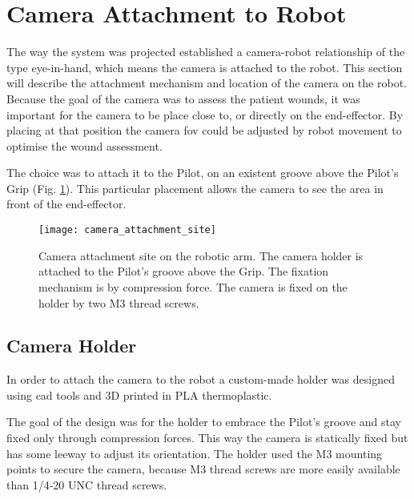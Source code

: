 

\section{Camera Attachment to Robot}
\label{sec:vision_system_camera_attachment}

The way the system was projected established a camera-robot relationship of the type eye-in-hand, which means the camera is attached to the robot. This section will describe the attachment mechanism and location of the camera on the robot.\\

Because the goal of the camera was to assess the patient wounds, it was important for the camera to be place close to, or directly on the end-effector. By placing at that position the camera \gls{fov} could be adjusted by robot movement to optimise the wound assessment.

The choice was to attach it to the Pilot, on an existent groove above the Pilot's Grip (Fig. \ref{fig:camera_attachment_site}). This particular placement allows the camera to see the area in front of the end-effector.

\begin{figure}[htbp]
	\centering
	\texttt{[image: camera\_attachment\_site]}
	\caption{Camera attachment site on the robotic arm. The camera holder is attached to the Pilot's groove above the Grip. The fixation mechanism is by compression force. The camera is fixed on the holder by two M3 thread screws.}
	\label{fig:camera_attachment_site}
\end{figure}

\subsection{Camera Holder}
\label{subsec:vision_system_camera_attachment_holder}

In order to attach the camera to the robot a custom-made holder was designed using \gls{cad} tools and 3D printed in PLA thermoplastic. 

The goal of the design was for the holder to embrace the Pilot's groove and stay fixed only through compression forces. This way the camera is statically fixed but has some leeway to adjust its orientation. The holder used the M3 mounting points to secure the camera, because M3 thread screws are more easily available than 1/4‑20 UNC thread screws.

